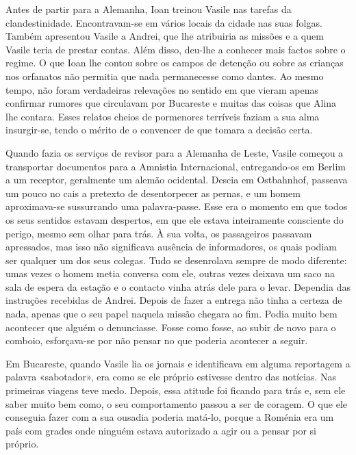 Antes de partir para a Alemanha, Ioan treinou Vasile nas tarefas da
clandestinidade. Encontravam-se em vários locais da cidade nas suas
folgas. Também apresentou Vasile a Andrei, que lhe atribuiria as missões
e a quem Vasile teria de prestar contas. Além disso, deu-lhe a conhecer
mais factos sobre o regime. O que Ioan lhe contou sobre os campos de
detenção ou sobre as crianças nos orfanatos não permitia que nada
permanecesse como dantes. Ao mesmo tempo, não foram verdadeiras
relevações no sentido em que vieram apenas confirmar rumores que
circulavam por Bucareste e muitas das coisas que Alina lhe contara.
Esses relatos cheios de pormenores terríveis faziam a sua alma
insurgir-se, tendo o mérito de o convencer de que tomara a decisão
certa.

Quando fazia os serviços de revisor para a Alemanha
de Leste, Vasile começou a transportar documentos para a Amnistia
Internacional, entregando-os em Berlim a um receptor, geralmente um
alemão ocidental. Descia em Ostbahnhof, passeava um pouco no cais a
pretexto de desentorpecer as pernas, e um homem aproximava-se
sussurrando uma palavra-passe. Esse era o momento em
que todos os seus sentidos estavam despertos, em que ele estava
inteiramente consciente do perigo, mesmo sem olhar para trás. À sua
volta, os passageiros passavam apressados, mas isso não significava
ausência de informadores, os quais podiam ser qualquer um dos seus
colegas. Tudo se desenrolava sempre de modo diferente: umas vezes o
homem metia conversa com ele, outras vezes deixava um saco na sala de
espera da estação e o contacto vinha atrás dele para o levar. Dependia
das instruções recebidas de Andrei. Depois de fazer a entrega não tinha
a certeza de nada, apenas que o seu papel naquela missão chegara ao fim.
Podia muito bem acontecer que alguém o denunciasse. Fosse como fosse, ao
subir de novo para o comboio, esforçava-se por não pensar no que poderia
acontecer a seguir.

Em Bucareste, quando Vasile lia os jornais e identificava em alguma reportagem a palavra «sabotador», era como se ele próprio
estivesse dentro das notícias. Nas primeiras viagens teve medo. Depois,
essa atitude foi ficando para trás e, sem ele saber muito bem como, o
seu comportamento passou a ser de coragem. O que ele conseguia fazer
com a sua ousadia poderia matá-lo, porque a Roménia era um país com
grades onde ninguém estava autorizado a agir ou a pensar por si próprio.

